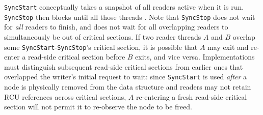 \lstinline|SyncStart| conceptually takes a snapshot of all readers active when it is run.
\lstinline|SyncStop| then blocks until all those threads .
Note that \lstinline|SyncStop| does not wait for \emph{all} readers to finish, and does not wait for all overlapping readers to simultaneously be out of critical sections.  If two reader threads $A$ and $B$ overlap some \lstinline|SyncStart|-\lstinline|SyncStop|'s critical section, it is possible that $A$ may exit and re-enter a read-side critical section before $B$ exits, and vice versa.  Implementations must distinguish subsequent read-side critical sections from earlier ones that overlapped the writer's initial request to wait: since \lstinline|SyncStart| is used \emph{after} a node is physically removed from the data structure and readers may not retain RCU references across critical sections, $A$ re-entering a fresh read-side critical section will not permit it to re-observe the node to be freed.

